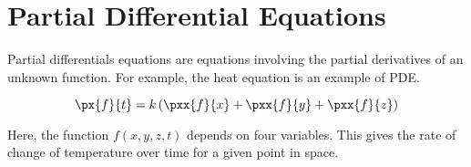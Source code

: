

\chapter{Partial Differential Equations}

\bigbreak

Partial differentials equations are equations involving the partial derivatives of an unknown function.
For example, the heat equation is an example of PDE.

$$ \px{f}{t} = k\left( \pxx{f}{x} + \pxx{f}{y} + \pxx{f}{z} \right) $$

Here, the function $f(x, y, z, t)$ depends on four variables.
This gives the rate of change of temperature over time for a given point in space.
